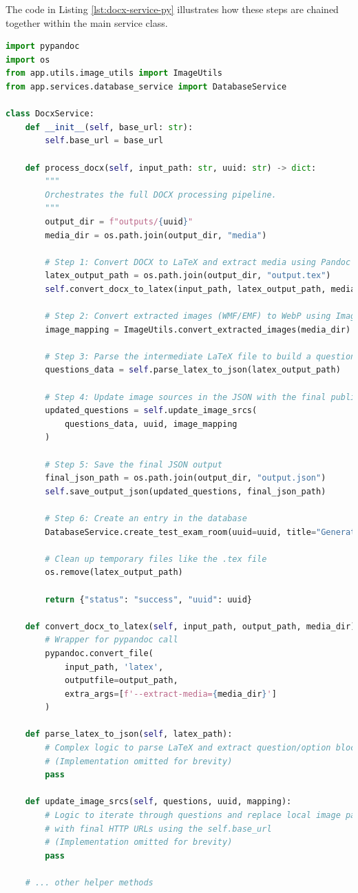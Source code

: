 The code in Listing \ref{lst:docx-service-py} illustrates how these steps are chained together within the main service class.

\FloatBarrier
\begin{lstlisting}[language=Python, caption={Illustrative logic of the `DocxService` in the Python microservice.}, label={lst:docx-service-py}]
import pypandoc
import os
from app.utils.image_utils import ImageUtils
from app.services.database_service import DatabaseService

class DocxService:
    def __init__(self, base_url: str):
        self.base_url = base_url

    def process_docx(self, input_path: str, uuid: str) -> dict:
        """
        Orchestrates the full DOCX processing pipeline.
        """
        output_dir = f"outputs/{uuid}"
        media_dir = os.path.join(output_dir, "media")
        
        # Step 1: Convert DOCX to LaTeX and extract media using Pandoc
        latex_output_path = os.path.join(output_dir, "output.tex")
        self.convert_docx_to_latex(input_path, latex_output_path, media_dir)
        
        # Step 2: Convert extracted images (WMF/EMF) to WebP using ImageMagick
        image_mapping = ImageUtils.convert_extracted_images(media_dir)
        
        # Step 3: Parse the intermediate LaTeX file to build a question structure
        questions_data = self.parse_latex_to_json(latex_output_path)
        
        # Step 4: Update image sources in the JSON with the final public URLs
        updated_questions = self.update_image_srcs(
            questions_data, uuid, image_mapping
        )
        
        # Step 5: Save the final JSON output
        final_json_path = os.path.join(output_dir, "output.json")
        self.save_output_json(updated_questions, final_json_path)

        # Step 6: Create an entry in the database
        DatabaseService.create_test_exam_room(uuid=uuid, title="Generated from DOCX")

        # Clean up temporary files like the .tex file
        os.remove(latex_output_path)
        
        return {"status": "success", "uuid": uuid}

    def convert_docx_to_latex(self, input_path, output_path, media_dir):
        # Wrapper for pypandoc call
        pypandoc.convert_file(
            input_path, 'latex',
            outputfile=output_path,
            extra_args=[f'--extract-media={media_dir}']
        )

    def parse_latex_to_json(self, latex_path):
        # Complex logic to parse LaTeX and extract question/option blocks
        # (Implementation omitted for brevity)
        pass

    def update_image_srcs(self, questions, uuid, mapping):
        # Logic to iterate through questions and replace local image paths
        # with final HTTP URLs using the self.base_url
        # (Implementation omitted for brevity)
        pass
    
    # ... other helper methods
\end{lstlisting}
